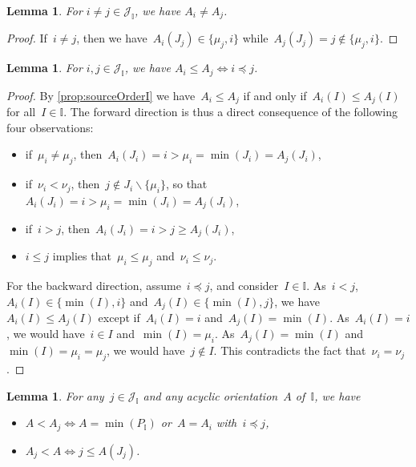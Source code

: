 \documentclass[reqno]{amsart}
\newtheorem{lemma}[theorem]{Lemma}
\theoremstyle{definition}
\newcommand{\cal}[1]{\mathcal{#1}} %
\newcommand{\ssm}{\smallsetminus} %
\newcommand{\II}{\mathbb I} %
\newcommand{\cJ}{\cal{J}} %
\begin{document}
\begin{lemma}
\label{lem:distinctIrreducibles}
For $i \ne j \in \cJ_\II$, we have $A_i \ne A_j$.
\end{lemma}

\begin{proof}
If~$i \ne j$, then we have~$A_i(J_j) \in \{\mu_j, i\}$ while~$A_j(J_j) = j \notin \{\mu_j,i\}$.
\end{proof}

\begin{lemma}
\label{lem:irrorder}
For $i,j \in \cJ_\II$, we have $A_i \le A_j \iff i \preccurlyeq j$.
\end{lemma}

\begin{proof}
By \cref{prop:sourceOrderI} we have~$A_i \le A_j$ if and only if~$A_i(I) \le A_j(I)$ for all~$I \in \II$.
%
The forward direction is thus a direct consequence of the following four observations:
\begin{itemize}
\item if~$\mu_i \ne \mu_j$, then~$A_i(J_i) = i > \mu_i = \min(J_i) = A_j(J_i)$,
\item if~$\nu_i < \nu_j$, then~$j \notin J_i \ssm \{\mu_i\}$, so that~$A_i(J_i) = i > \mu_i = \min(J_i) = A_j(J_i)$,
\item if~$i > j$, then~$A_i(J_i) = i > j \ge A_j(J_i)$,
\item $i \le j$ implies that~$\mu_i \le \mu_j$ and~$\nu_i \le \nu_j$.
\end{itemize}
%
For the backward direction, assume~$i \preccurlyeq j $, and consider~$I \in \II$.
As~$i < j$, $A_i(I) \in \{\min(I), i\}$ and~$A_j(I) \in \{\min(I), j\}$, we have~$A_i(I) \le A_j(I)$ except if~$A_i(I) = i$ and~$A_j(I) = \min(I)$.
As~$A_i(I) = i$, we would have~$i \in I$ and~$\min(I) = \mu_i$. As~$A_j(I) = \min(I)$ and~$\min(I) = \mu_i = \mu_j$, we would have~$j \notin I$.
This contradicts the fact that~$\nu_i = \nu_j$.
\end{proof}

\begin{lemma}
\label{lem:subirr}
For any~$j \in \cJ_\II$ and any acyclic orientation~$A$ of~$\II$, we have
\begin{itemize}
\item $A < A_j \iff A = \min(P_\II)$ or~$A = A_i$ with~$i \preccurlyeq j$,
\item $A_j < A \iff j \le A(J_j)$.
\end{itemize}
\end{lemma}
\end{document}
